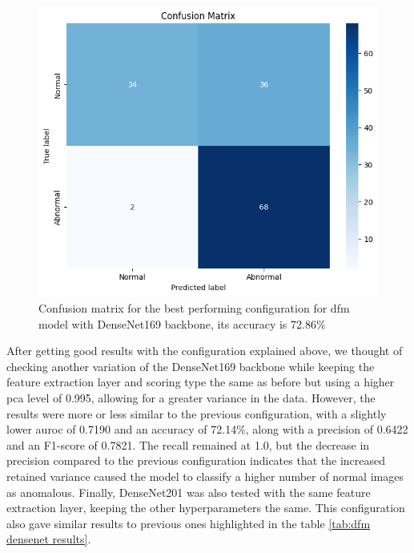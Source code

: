 \begin{figure}[ht!]
    \centering
    \includegraphics[width=1\linewidth]{Rohit_Master_Thesis//Images/dfm_densenet_best_confusion_matrix.png}
    \caption{Confusion matrix for the best performing configuration for \gls{dfm} model with DenseNet169 backbone, its accuracy is 72.86\%}
    \label{fig:dfm densenet169 confusion matrix}
\end{figure}

After getting good results with the configuration explained above, we thought of checking another variation of the DenseNet169 backbone while keeping the feature extraction layer and scoring type the same as before but using a higher \gls{pca} level of 0.995, allowing for a greater variance in the data. However, the results were more or less similar to the previous configuration, with a slightly lower \gls{auroc} of 0.7190 and an accuracy of 72.14\%, along with a precision of 0.6422 and an F1-score of 0.7821. The recall remained at 1.0, but the decrease in precision compared to the previous configuration indicates that the increased retained variance caused the model to classify a higher number of normal images as anomalous. Finally, DenseNet201 was also tested with the same feature extraction layer, keeping the other hyperparameters the same. This configuration also gave similar results to previous ones highlighted in the table \ref{tab:dfm densenet results}.



